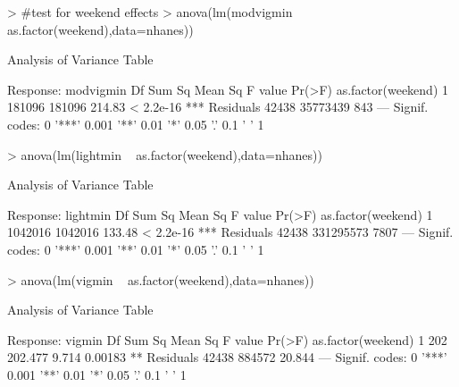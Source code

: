 \documentclass[11pt]{article}
\begin{document}
\begin{Schunk}
\begin{Sinput}
> #test for weekend effects
> anova(lm(modvigmin ~ as.factor(weekend),data=nhanes))
\end{Sinput}
\begin{Soutput}
Analysis of Variance Table

Response: modvigmin
                      Df   Sum Sq Mean Sq F value    Pr(>F)    
as.factor(weekend)     1   181096  181096  214.83 < 2.2e-16 ***
Residuals          42438 35773439     843                      
---
Signif. codes:  0 '***' 0.001 '**' 0.01 '*' 0.05 '.' 0.1 ' ' 1
\end{Soutput}
\begin{Sinput}
> anova(lm(lightmin ~ as.factor(weekend),data=nhanes))
\end{Sinput}
\begin{Soutput}
Analysis of Variance Table

Response: lightmin
                      Df    Sum Sq Mean Sq F value    Pr(>F)    
as.factor(weekend)     1   1042016 1042016  133.48 < 2.2e-16 ***
Residuals          42438 331295573    7807                      
---
Signif. codes:  0 '***' 0.001 '**' 0.01 '*' 0.05 '.' 0.1 ' ' 1
\end{Soutput}
\begin{Sinput}
> anova(lm(vigmin ~ as.factor(weekend),data=nhanes))
\end{Sinput}
\begin{Soutput}
Analysis of Variance Table

Response: vigmin
                      Df Sum Sq Mean Sq F value  Pr(>F)   
as.factor(weekend)     1    202 202.477   9.714 0.00183 **
Residuals          42438 884572  20.844                   
---
Signif. codes:  0 '***' 0.001 '**' 0.01 '*' 0.05 '.' 0.1 ' ' 1
\end{Soutput}
\end{Schunk}
\end{document}

